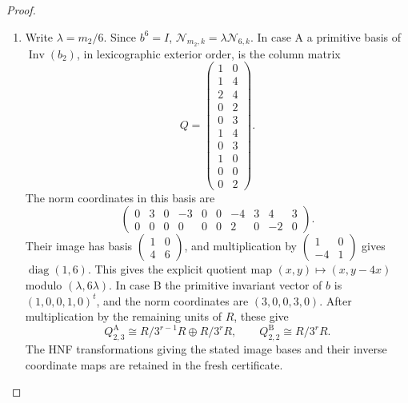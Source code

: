 \begin{proof}
\begin{enumerate}[label=\arabic*.]
The actual covering map on the horizontal term of the Wang
sequence is the norm
\[
 \mathcal N_{m_2,k}=\sum_{j=0}^{m_2-1}b_k^j:
 \operatorname{coker}(b_k-I)\longrightarrow\operatorname{Inv}(b_k).
\]
Indeed, the lift is the union of the $m_2$ successive prisms
with their transported coefficients.  On the vertical invariant
quotient pullback is the identity.  Consequently horizontal
inclusion induces the actual isomorphism
\[
 \frac{\operatorname{Inv}(b_{q-1})}
      {\mathcal N_{m_2,q-1}\bigwedge^{q-1}R^5}
 \ \xrightarrow{\ \sim\ }\
 \frac{\operatorname{Inv}(\bigwedge^q V_R)}{J_{2,q}}.
\]
Surjectivity follows by subtracting a restriction with the same
vertical component; its kernel is exactly the horizontal norm
image.  Thus no choice of a Wang splitting changes this quotient.

\item Write $\lambda=m_2/6$.  Since $b^6=I$,
$\mathcal N_{m_2,k}=\lambda\mathcal N_{6,k}$.
In case A a primitive basis of $\operatorname{Inv}(b_2)$,
in lexicographic exterior order, is the column matrix
\[
 Q=\begin{pmatrix}
 1&0\\1&4\\2&4\\0&2\\0&3\\1&4\\0&3\\1&0\\0&0\\0&2
 \end{pmatrix}.
\]
The norm coordinates in this basis are
\[
 \begin{pmatrix}
 0&3&0&-3&0&0&-4&3&4&3\\
 0&0&0&0&0&0&2&0&-2&0
 \end{pmatrix}.
\]
Their image has basis $\left(\begin{smallmatrix}1&0\\4&6\end{smallmatrix}\right)$,
and multiplication by
$\left(\begin{smallmatrix}1&0\\-4&1\end{smallmatrix}\right)$
gives $\operatorname{diag}(1,6)$.  This gives the explicit quotient
map $(x,y)\mapsto(x,y-4x)$ modulo $(\lambda,6\lambda)$.
In case B the primitive invariant vector of $b$ is
$(1,0,0,1,0)^t$, and the norm coordinates are $(3,0,0,3,0)$.
After multiplication by the remaining units of $R$, these give
\[
 Q_{2,3}^{\mathrm A}\cong R/3^{r-1}R\oplus R/3^rR,
 \qquad Q_{2,2}^{\mathrm B}\cong R/3^rR.
\]
The HNF transformations giving the stated image bases and their
inverse coordinate maps are retained in the fresh certificate.


\end{enumerate}
\end{proof}
